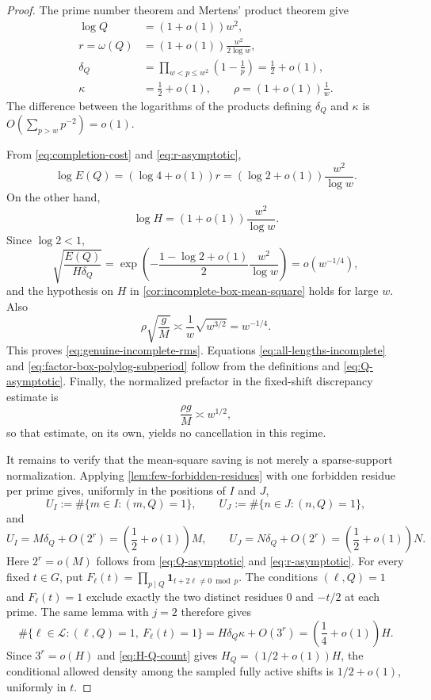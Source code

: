 \documentclass[11pt]{article}
\theoremstyle{definition}
\theoremstyle{remark}
\newcommand{\one}{\mathbf 1}
\newcommand{\cL}{\mathcal L}
\begin{document}
\begin{proof}
The prime number theorem and Mertens' product theorem give
\begin{align}
 \log Q&=(1+o(1))w^2,\label{eq:Q-asymptotic}\\
 r=\omega(Q)&=(1+o(1))\frac{w^2}{2\log w},\label{eq:r-asymptotic}\\
 \delta_Q&=\prod_{w<p\le w^2}\left(1-\frac1p\right)
 =\frac12+o(1),\label{eq:delta-asymptotic}\\
 \kappa&=\frac12+o(1),
 \qquad
 \rho=(1+o(1))\frac1w.\label{eq:kappa-rho-asymptotic}
\end{align}
The difference between the logarithms of the products defining $\delta_Q$ and $\kappa$ is $O(\sum_{p>w}p^{-2})=o(1)$.

From \eqref{eq:completion-cost} and \eqref{eq:r-asymptotic},
\begin{equation}\label{eq:E-asymptotic}
 \log E(Q)
 =(\log4+o(1))r
 =(\log2+o(1))\frac{w^2}{\log w}.
\end{equation}
On the other hand,
\begin{equation}\label{eq:H-asymptotic}
 \log H=(1+o(1))\frac{w^2}{\log w}.
\end{equation}
Since $\log2<1$,
\[
 \sqrt{\frac{E(Q)}{H\delta_Q}}
 =\exp\left(-\frac{1-\log2+o(1)}2
                 \frac{w^2}{\log w}\right)
 =o(w^{-1/4}),
\]
and the hypothesis on $H$ in \cref{cor:incomplete-box-mean-square} holds for large $w$.  Also
\[
 \rho\sqrt{\frac{g}{M}}
 \asymp\frac1w\sqrt{w^{3/2}}
 =w^{-1/4}.
\]
This proves \eqref{eq:genuine-incomplete-rms}.  Equations \eqref{eq:all-lengths-incomplete} and \eqref{eq:factor-box-polylog-subperiod} follow from the definitions and \eqref{eq:Q-asymptotic}.  Finally, the normalized prefactor in the fixed-shift discrepancy estimate is
\[
 \frac{\rho g}{M}\asymp w^{1/2},
\]
so that estimate, on its own, yields no cancellation in this regime.

It remains to verify that the mean-square saving is not merely a sparse-support normalization.  Applying \cref{lem:few-forbidden-residues} with one forbidden residue per prime gives, uniformly in the positions of $I$ and $J$,
\[
 U_I:=\#\{m\in I:(m,Q)=1\},
 \qquad
 U_J:=\#\{n\in J:(n,Q)=1\},
\]
and
\[
 U_I=M\delta_Q+O(2^r)
     =\left(\frac12+o(1)\right)M,
 \qquad
 U_J=N\delta_Q+O(2^r)
     =\left(\frac12+o(1)\right)N.
\]
Here $2^r=o(M)$ follows from \eqref{eq:Q-asymptotic} and \eqref{eq:r-asymptotic}.  For every fixed $t\in G$, put $F_\ell(t)=\prod_{p\mid Q}\one_{t+2\ell\ne0\bmod p}$.  The conditions $(\ell,Q)=1$ and $F_\ell(t)=1$ exclude exactly the two distinct residues $0$ and $-t/2$ at each prime.  The same lemma with $j=2$ therefore gives
\[
 \#\{\ell\in\cL:(\ell,Q)=1,\ F_\ell(t)=1\}
 =H\delta_Q\kappa+O(3^r)
 =\left(\frac14+o(1)\right)H.
\]
Since $3^r=o(H)$ and \eqref{eq:H-Q-count} gives $H_Q=(1/2+o(1))H$, the conditional allowed density among the sampled fully active shifts is $1/2+o(1)$, uniformly in $t$.
\end{proof}
\end{document}
